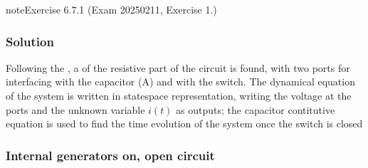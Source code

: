 \documentclass[letterpaper,10pt,english]{jupyterBook}
\begin{document}
 \label{exercise:exam-25-02-11-exe-01}

\begin{sphinxadmonition}{note}{Exercise 6.7.1 (Exam 2025\sphinxhyphen{}02\sphinxhyphen{}11, Exercise 1.)}



\begin{figure}[htbp]
\centering

\noindent{}
\end{figure}
\subsubsection*{Solution}

\sphinxAtStartPar
Following the , a {\hyperref[\detokenize{ch/electrical-engineering-networks:classical-electromagnetism-electrical-engineering-newtork-analysis-thevenin-n-port}]{}} of the resistive part of the circuit is found, with two ports for interfacing with the capacitor (A) and with the switch. The dynamical equation of the system is written in state\sphinxhyphen{}space representation, writing the voltage at the ports and the unknown variable \(i(t)\) as outputs; the capacitor contitutive equation is used to find the time evolution of the system once the switch is closed

\begin{figure}[htbp]
\centering

\noindent{}
\end{figure}
\subsubsection*{Internal generators on, open circuit}


\end{sphinxadmonition}
\end{document}
